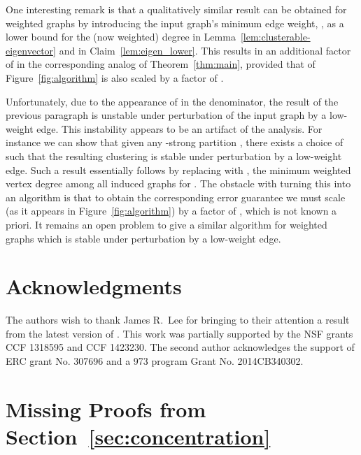 \documentclass[11pt]{article}
\theoremstyle{plain}
\begin{document}
One interesting remark is that a qualitatively similar result can be obtained for weighted graphs by introducing the input graph's minimum edge weight, , as a lower bound for the (now weighted) degree in Lemma~\ref{lem:clusterable-eigenvector} and in Claim~\ref{lem:eigen_lower}.
This results in an additional factor of  in the corresponding analog of Theorem~\ref{thm:main}, provided that  of Figure~\ref{fig:algorithm} is also scaled by a factor of .

Unfortunately, due to the appearance of  in the denominator, the result of the previous paragraph is unstable under perturbation of the input graph by a low-weight edge. This instability appears to be an artifact of the analysis. For instance we can show that given any -strong partition , there exists a choice of  such that the resulting clustering is stable under perturbation by a low-weight edge. Such a result essentially follows by replacing  with , the minimum weighted vertex degree among all induced graphs  for . The obstacle with turning this into an algorithm is that to obtain the corresponding error guarantee we must scale  (as it appears in  Figure~\ref{fig:algorithm}) by a factor of , which is not known a priori. It remains an open problem to give a similar algorithm for weighted graphs which is stable under perturbation by a low-weight edge.


\section*{Acknowledgments}
The authors wish to thank James R.~Lee for bringing to their attention a result from the latest version of \cite{DBLP:conf/stoc/LeeGT12}.
This work was partially supported by the NSF grants
CCF 1318595 and CCF 1423230. The second author acknowledges the
support of ERC grant No. 307696 and a 973 program Grant No. 2014CB340302.



\appendix

\section{Missing Proofs from Section~\ref{sec:concentration}}\label{appendix:eigenvector}
\end{document}
